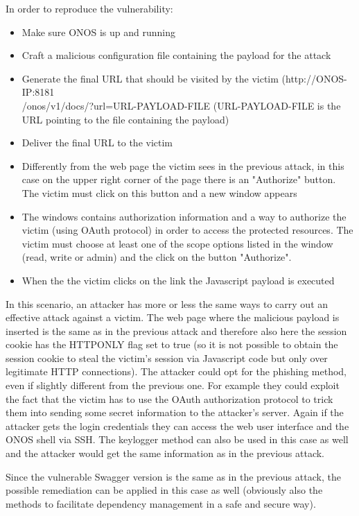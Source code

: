In order to reproduce the vulnerability:
\begin{itemize}
    \item Make sure ONOS is up and running
    \item Craft a malicious configuration file containing the payload for the attack
    \item Generate the final URL that should be visited by the victim (http://ONOS-IP:8181\\/onos/v1/docs/?url=URL-PAYLOAD-FILE (URL-PAYLOAD-FILE is the URL pointing to the file containing the payload)
    \item Deliver the final URL to the victim
    \item Differently from the web page the victim sees in the previous attack, in this case on the upper right corner of the page there is an "Authorize" button. The victim must click on this button and a new window appears
    \item The windows contains authorization information and a way to authorize the victim (using OAuth protocol) in order to access the protected resources. The victim must choose at least one of the scope options listed in the window (read, write or admin) and the click on the button "Authorize".
    \item When the the victim clicks on the link the Javascript payload is executed
\end{itemize}
In this scenario, an attacker has more or less the same ways to carry out an effective attack against a victim. The web page where the malicious payload is inserted is the same as in the previous attack and therefore also here the session cookie has the HTTPONLY flag set to true (so it is not possible to obtain the session cookie to steal the victim's session via Javascript code but only over legitimate HTTP connections). The attacker could opt for the phishing method, even if slightly different from the previous one. For example they could exploit the fact that the victim has to use the OAuth authorization protocol to trick them into sending some secret information to the attacker's server. Again if the attacker gets the login credentials they can access the web user interface and the ONOS shell via SSH. The keylogger method can also be used in this case as well and the attacker would get the same information as in the previous attack.

Since the vulnerable Swagger version is the same as in the previous attack, the possible remediation can be applied in this case as well (obviously also the methods to facilitate dependency management in a safe and secure way).


